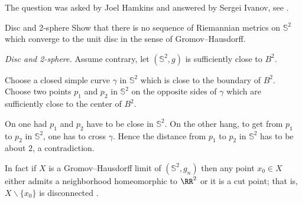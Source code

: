  The question was asked by Joel Hamkins and answered by Sergei Ivanov, see \cite{hamkins}.









\begin{pr}{}{Disc and 2-sphere}\label{2-sphere is far from a ball}
Show that there is no sequence of Riemannian metrics on
$\mathbb{S}^2$ which converge to the unit disc in the sense of Gromov--Hausdorff.
\end{pr}
\textit{Disc and 2-sphere.}
Assume contrary, let $(\mathbb{S}^2,g)$ is sufficiently close to $B^2$.

Choose a closed simple curve $\gamma$ in $\mathbb{S}^2$ which is close to the boundary of $B^2$.
Choose two points $p_1$ and $p_2$ in $\mathbb{S}^2$ 
on the opposite sides of $\gamma$ which are sufficiently close to the center of $B^2$.

On one had $p_1$ and $p_2$ have to be close in $\mathbb{S}^2$.
On the other hang, to get from $p_1$ to $p_2$ in $\mathbb{S}^2$,
one has to cross $\gamma$.
Hence the distance from $p_1$ to $p_2$ in $\mathbb{S}^2$ has to be about $2$,
a contradiction.

In fact if $X$ is a Gromov--Hausdorff limit of $(\mathbb{S}^2,g_n)$
then any point $x_0\in X$ either admits a neighborhood homeomorphic to $\RR^2$ or it is a cut point;
that is, $X\backslash\{x_0\}$ is disconnected \cite[see][3.32]{gromov-MetStr}.







